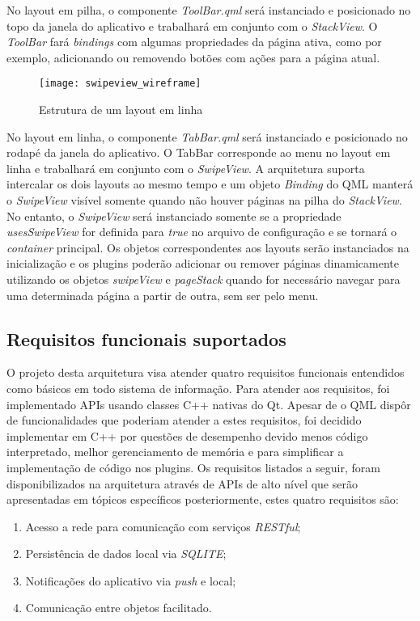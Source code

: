 No layout em pilha, o componente \textit{ToolBar.qml} será instanciado e posicionado no topo da janela do aplicativo e trabalhará em conjunto com o \textit{StackView}. O \textit{ToolBar} fará \textit{bindings} com algumas propriedades da página ativa, como por exemplo, adicionando ou removendo botões com ações para a página atual.

\begin{figure}[H]
	\texttt{[image: swipeview\_wireframe]}
	\centering
	\caption{Estrutura de um layout em linha}
\end{figure}

No layout em linha, o componente \textit{TabBar.qml} será instanciado e posicionado no rodapé da janela do aplicativo. O TabBar corresponde ao menu no layout em linha e trabalhará em conjunto com o \textit{SwipeView}. A arquitetura suporta intercalar os dois layouts ao mesmo tempo e um objeto \textit{Binding} do QML manterá o \textit{SwipeView} visível somente quando não houver páginas na pilha do \textit{StackView}. No entanto, o \textit{SwipeView} será instanciado somente se a propriedade \textit{usesSwipeView} for definida para \textit{true} no arquivo de configuração e se tornará o \textit{container} principal. Os objetos correspondentes aos layouts serão instanciados na inicialização e os plugins poderão adicionar ou remover páginas dinamicamente utilizando os objetos \textit{swipeView} e \textit{pageStack} quando for necessário navegar para uma determinada página a partir de outra, sem ser pelo menu.\par


\subsection{Requisitos funcionais suportados}
O projeto desta arquitetura visa atender quatro requisitos funcionais entendidos como básicos em todo sistema de informação. Para atender aos requisitos, foi implementado APIs usando classes C++ nativas do Qt. Apesar de o QML dispôr de funcionalidades que poderiam atender a estes requisitos, foi decidido implementar em C++ por questões de desempenho devido menos código interpretado, melhor gerenciamento de memória e para simplificar a implementação de código nos plugins. Os requisitos listados a seguir, foram disponibilizados na arquitetura através de APIs de alto nível que serão apresentadas em tópicos específicos posteriormente, estes quatro requisitos são:

\begin{enumerate}
	\item Acesso a rede para comunicação com serviços \textit{RESTful};
	\item Persistência de dados local via \textit{SQLITE};
	\item Notificações do aplicativo via \textit{push} e local;
	\item Comunicação entre objetos facilitado.
\end{enumerate}


